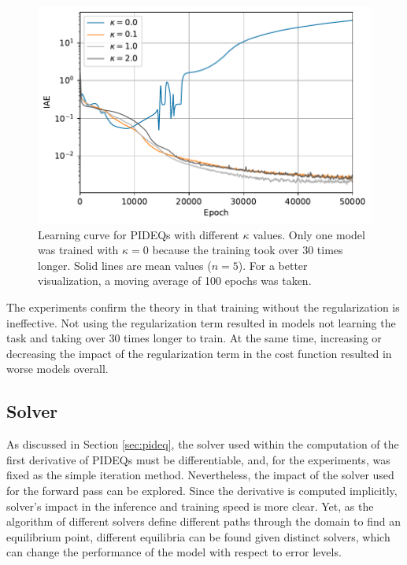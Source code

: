\begin{figure}[h]
    \centering
    \includegraphics{images/exp_4_iae.pdf}
    \caption{Learning curve for \gls{PIDEQ}s with different $\kappa$ values. Only one model was trained with $\kappa=0$ because the training took over 30 times longer. Solid lines are mean values ($n=5$). For a better visualization, a moving average of 100 epochs was taken.}
    \label{fig:jac-lamb-iae}
\end{figure}

The experiments confirm the theory in that training without the regularization is ineffective.
Not using the regularization term resulted in models not learning the task and taking over 30 times longer to train.
At the same time, increasing or decreasing the impact of the regularization term in the cost function resulted in worse models overall.

\subsection{Solver}

As discussed in Section \ref{sec:pideq}, the solver used within the computation of the first derivative of \glspl{PIDEQ} must be differentiable, and, for the experiments, was fixed as the simple iteration method.
Nevertheless, the impact of the solver used for the forward pass can be explored.
Since the derivative is computed implicitly, solver's impact in the inference and training speed is more clear.
Yet, as the algorithm of different solvers define different paths through the domain to find an equilibrium point, different equilibria can be found given distinct solvers, which can change the performance of the model with respect to error levels. 

